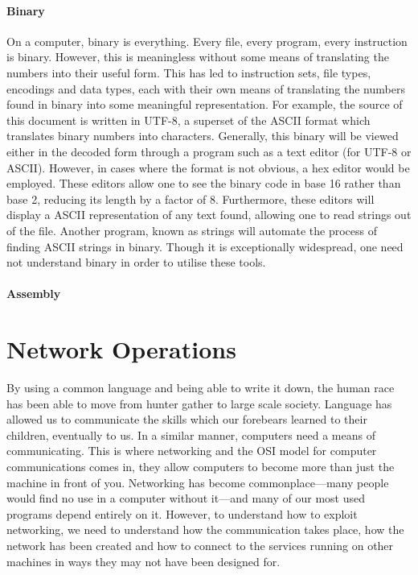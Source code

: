 \documentclass[a4paper,11pt]{report}
\begin{document}
		\subsubsection{Binary}
			On a computer, binary is everything.
			Every file, every program, every instruction is binary. 
			However, this is meaningless without some means of translating the numbers into their useful form. 
			This has led to instruction sets, file types, encodings and data types, each with their own means of translating the numbers found in binary into some meaningful representation. 
			For example, the source of this document is written in UTF-8, a superset of the ASCII format which translates binary numbers into characters. 
			Generally, this binary will be viewed either in the decoded form through a program such as a text editor (for UTF-8 or ASCII). 
			However, in cases where the format is not obvious, a hex editor would be employed. 
			These editors allow one to see the binary code in base 16 rather than base 2, reducing its length by a factor of 8. 
			Furthermore, these editors will display a ASCII representation of any text found, allowing one to read strings out of the file. 
			Another program, known as strings will automate the process of finding ASCII strings in binary. 
			Though it is exceptionally widespread, one need not understand binary in order to utilise these tools. 
		\subsubsection{Assembly}
			
\chapter{Network Operations}
	By using a common language and being able to write it down, the human race has been able to move from hunter gather to large scale society. 
	Language has allowed us to communicate the skills which our forebears learned to their children, eventually to us. 
	In a similar manner, computers need a means of communicating. 
	This is where networking and the OSI model for computer communications comes in, they allow computers to become more than just the machine in front of you. 
	Networking has become commonplace---many people would find no use in a computer without it---and many of our most used programs depend entirely on it. 
	However, to understand how to exploit networking, we need to understand how the communication takes place, how the network has been created and how to connect to the services running on other machines in ways they may not have been designed for. 
\end{document}
